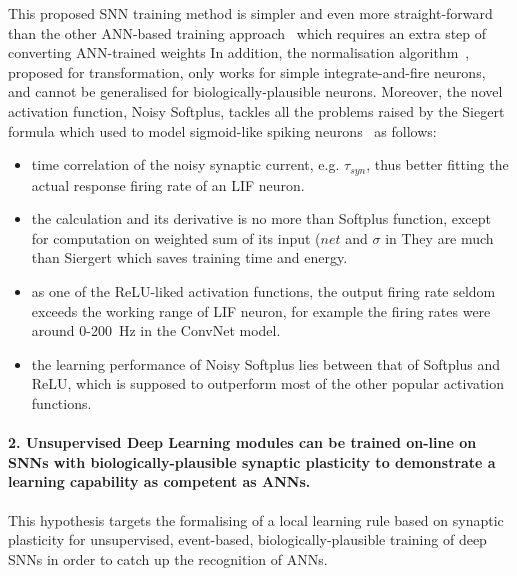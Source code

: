 This proposed SNN training method is simpler and even more straight-forward than the other ANN-based training approach~\citep{cao2015spiking,diehl2015fast} which requires an extra step of converting ANN-trained weights \protect{} \protect{}
In addition, the normalisation algorithm~\citep{diehl2015fast}, proposed for \protect{} \protect{} transformation, only works for simple integrate-and-fire neurons, and cannot be generalised for biologically-plausible neurons.
Moreover, the novel activation function, Noisy Softplus, tackles all the problems raised by the Siegert formula which \protect{} used to model sigmoid-like spiking neurons~\citep{Jug_etal_2012} as follows: 
	\begin{itemize}
		\item \protect{} \protect{} time correlation of the noisy synaptic current, e.g. $\tau_{syn}$, thus better fitting the actual response firing rate of an LIF neuron. 

		\item the calculation \protect{} \protect{} and its derivative is no more \protect{} than \protect{} Softplus function, except for \protect{} \protect{} computation on \protect{} weighted sum of its input ($net$ and $\sigma$ in \protect{} \protect{}
		They are \protect{} \protect{} much \protect{} \protect{} than \protect{} Siergert \protect{} \protect{} which saves training time and energy.
		
		\item as one of the ReLU-liked activation functions, the output firing rate seldom exceeds the working range of \protect{} \protect{} LIF neuron, for example the firing rates were around 0-200~Hz in the ConvNet model.
		
		\item the learning performance of Noisy Softplus lies between that of Softplus and ReLU, which is supposed to outperform most of the other popular activation functions.
	\end{itemize}

\paragraph{2. Unsupervised Deep Learning modules can be trained on-line on SNNs with biologically-plausible synaptic plasticity to demonstrate a learning capability as competent as ANNs.}
This hypothesis targets the formalising of a local learning rule based on synaptic plasticity for unsupervised, event-based, biologically-plausible training of deep SNNs in order to catch up \protect{} the recognition \protect{} \protect{} of ANNs.

